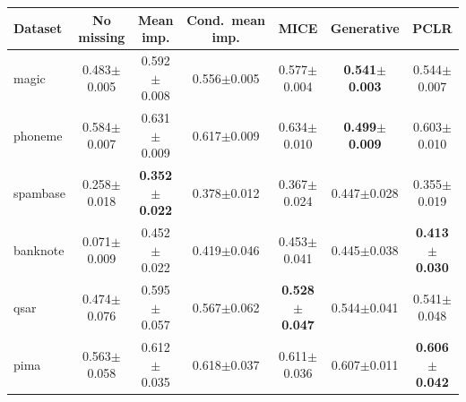 \begin{tabular}{lcccccc}
\toprule
Dataset & No missing & Mean imp. & Cond.\ mean imp. & MICE & Generative & PCLR \\
\midrule
magic & 0.483{\scriptsize$\pm$0.005} & 0.592{\scriptsize$\pm$0.008} & 0.556{\scriptsize$\pm$0.005} & 0.577{\scriptsize$\pm$0.004} & \textbf{0.541{\scriptsize$\pm$0.003}} & 0.544{\scriptsize$\pm$0.007} \\
phoneme & 0.584{\scriptsize$\pm$0.007} & 0.631{\scriptsize$\pm$0.009} & 0.617{\scriptsize$\pm$0.009} & 0.634{\scriptsize$\pm$0.010} & \textbf{0.499{\scriptsize$\pm$0.009}} & 0.603{\scriptsize$\pm$0.010} \\
spambase & 0.258{\scriptsize$\pm$0.018} & \textbf{0.352{\scriptsize$\pm$0.022}} & 0.378{\scriptsize$\pm$0.012} & 0.367{\scriptsize$\pm$0.024} & 0.447{\scriptsize$\pm$0.028} & 0.355{\scriptsize$\pm$0.019} \\
banknote & 0.071{\scriptsize$\pm$0.009} & 0.452{\scriptsize$\pm$0.022} & 0.419{\scriptsize$\pm$0.046} & 0.453{\scriptsize$\pm$0.041} & 0.445{\scriptsize$\pm$0.038} & \textbf{0.413{\scriptsize$\pm$0.030}} \\
qsar & 0.474{\scriptsize$\pm$0.076} & 0.595{\scriptsize$\pm$0.057} & 0.567{\scriptsize$\pm$0.062} & \textbf{0.528{\scriptsize$\pm$0.047}} & 0.544{\scriptsize$\pm$0.041} & 0.541{\scriptsize$\pm$0.048} \\
pima & 0.563{\scriptsize$\pm$0.058} & 0.612{\scriptsize$\pm$0.035} & 0.618{\scriptsize$\pm$0.037} & 0.611{\scriptsize$\pm$0.036} & 0.607{\scriptsize$\pm$0.011} & \textbf{0.606{\scriptsize$\pm$0.042}} \\
\bottomrule
\end{tabular}
